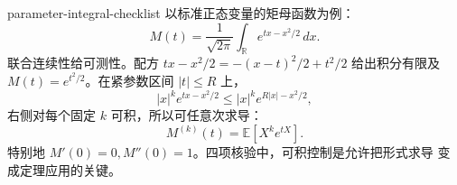 \begin{solution}{parameter-integral-checklist}
以标准正态变量的矩母函数为例：
\[
 M(t)=\frac1{\sqrt{2\pi}}\int_{\mathbb R}
 e^{tx-x^2/2}\,dx.
\]
联合连续性给可测性。配方
\(tx-x^2/2=-(x-t)^2/2+t^2/2\) 给出积分有限及
\(M(t)=e^{t^2/2}\)。在紧参数区间 \(|t|\le R\) 上，
\[
 |x|^k e^{tx-x^2/2}
 \le |x|^ke^{R|x|-x^2/2},
\]
右侧对每个固定 \(k\) 可积，所以可任意次求导：
\[
 M^{(k)}(t)=\mathbb E[X^ke^{tX}].
\]
特别地 \(M'(0)=0,M''(0)=1\)。四项核验中，可积控制是允许把形式求导
变成定理应用的关键。
\end{solution}
